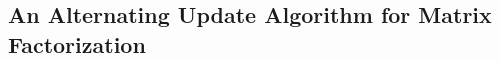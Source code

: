 \documentclass[11pt,letterpaper]{article}
\newcommand{\R}{\mathbb{R}}
\renewcommand{\L}{\mathcal{L}}
\newcommand{\M}{\mathcal{M}}
\begin{document}
%
%
%
%
%
%
%
%
%
%
%
%
%
%
%

\subsection{An Alternating Update Algorithm for Matrix Factorization} \label{sec:algorithm_am}
\end{document}

